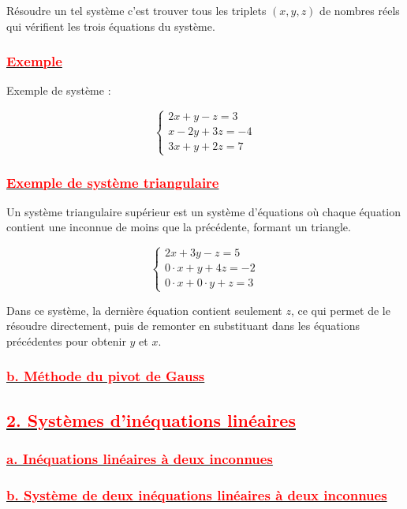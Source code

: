 \documentclass[12pt]{article}
\begin{document}
Résoudre un tel système c’est trouver tous les triplets \((x, y, z)\) de nombres réels qui vérifient les trois équations du système.

\subsubsection*{\underline{\textbf{\textcolor{red}{ Exemple }}}}

Exemple de système :

\[
\begin{cases}
2x + y - z = 3 \\
x - 2y + 3z = -4 \\
3x + y + 2z = 7
\end{cases}
\]

\subsubsection*{\underline{\textbf{\textcolor{red}{Exemple de système triangulaire}}}}

Un système triangulaire supérieur est un système d'équations où chaque équation contient une inconnue de moins que la précédente, formant un triangle.

\[
\begin{cases}
2x + 3y - z = 5 \\
0 \cdot x + y + 4z = -2 \\
0 \cdot x + 0 \cdot y + z = 3
\end{cases}
\]

Dans ce système, la dernière équation contient seulement \( z \), ce qui permet de le résoudre directement, puis de remonter en substituant dans les équations précédentes pour obtenir \( y \) et \( x \).

\subsubsection*{\underline{\textbf{\textcolor{red}{b. Méthode du pivot de Gauss }}}}

\subsection*{\underline{\textbf{\textcolor{red}{2. Systèmes d’inéquations linéaires }}}}
\subsubsection*{\underline{\textbf{\textcolor{red}{a. Inéquations linéaires à deux inconnues}}}}
\subsubsection*{\underline{\textbf{\textcolor{red}{b. Système de deux inéquations linéaires à deux inconnues }}}}
\end{document}
